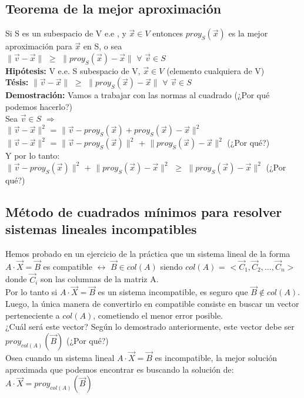 \documentclass[11pt]{article}
\begin{document}
\subsection{Teorema de la mejor aproximación}
Si S es un subespacio de V e.e , y $\vec{x} \in V$ entonces $proy_S(\vec{x})$ es la mejor aproximación para $\vec{x}$ en S, o sea\\
$\parallel \vec{v} - \vec{x} \parallel$ $\geq$ $\parallel proy_S(\vec{x}) - \vec{x} \parallel$ $\forall$ $\vec{v} \in S$\\
\textbf{Hipótesis:} V e.e. S subespacio de V, $\vec{x} \in V$ (elemento cualquiera de V) \\
\textbf{Tésis:} $\parallel \vec{v} - \vec{x} \parallel$ $\geq$ $\parallel proy_S(\vec{x}) - \vec{x} \parallel$ $\forall$ $\vec{v} \in S$\\
\textbf{Demostración:} Vamos a trabajar con las normas al
cuadrado (¿Por qué podemos hacerlo?)\\
Sea $\vec{v} \in S$ $\Rightarrow$\\
$\parallel \vec{v} - \vec{x} \parallel^2$ = $\parallel \vec{v} - proy_S(\vec{x}) + proy_S(\vec{x}) - \vec{x} \parallel^2$ \\
$\parallel \vec{v} - \vec{x} \parallel^2$ = $\parallel \vec{v} - proy_S(\vec{x}) \parallel^2$ + $\parallel proy_S(\vec{x})- \vec{x} \parallel^2$ (¿Por qué?)\\
Y por lo tanto: \\
$\parallel \vec{v} - proy_S(\vec{x}) \parallel^2$ + $\parallel proy_S(\vec{x})- \vec{x} \parallel^2$ $\geq$ $\parallel proy_S(\vec{x})- \vec{x} \parallel^2$ (¿Por qué?)
\newpage
\subsection{Método de cuadrados mínimos para resolver sistemas lineales incompatibles}
Hemos probado en un ejercicio de la práctica que un sistema lineal de la forma $A\cdot\vec{X}=\vec{B}$ es compatible $\leftrightarrow$ $\vec{B} \in col(A)$ siendo $col(A)$ = $<\vec{C}_1, \vec{C}_2, \ldots, \vec{C}_n>$ donde $\vec{C}_i$ son las columnas de la matriz A. \\
Por lo tanto si $A\cdot\vec{X}=\vec{B}$ es un sistema incompatible, es seguro que $\vec{B} \notin col(A)$. Luego, la única manera de convertirlo en compatible consiste en buscar un vector perteneciente a $col(A)$, cometiendo el menor error posible. \\
¿Cuál será este vector? Según lo demostrado anteriormente, este vector debe ser $proy_{col(A)}(\vec{B})$ (¿Por qué?)\\
Osea cuando un sistema lineal $A\cdot\vec{X}=\vec{B}$ es incompatible, la mejor solución aproximada que podemos encontrar es buscando la solución de: \\
$A\cdot\vec{X}=proy_{col(A)}(\vec{B})$
\end{document}
